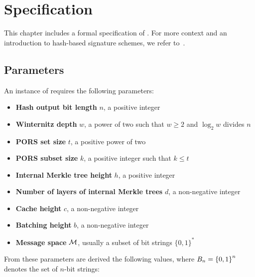 \chapter{Specification}\label{chap:specification}

This chapter includes a formal specification of \gravity. 
For more context and an introduction to hash-based signature schemes, we refer to~\cite{masters,ctrsapaper}.

\section{Parameters}

An instance of \gravity{} requires the following parameters:
\begin{itemize}
\item \textbf{Hash output bit length} $n$, a positive integer
\item \textbf{Winternitz depth} $w$, a power of two such that $w \ge 2$ and $\log_2{w}$ divides $n$
\item \textbf{PORS set size} $t$, a positive power of two
\item \textbf{PORS subset size} $k$, a positive integer such that $k \le t$
\item \textbf{Internal Merkle tree height} $h$, a positive integer
\item \textbf{Number of layers of internal Merkle trees} $d$, a non-negative integer
\item \textbf{Cache height} $c$, a non-negative integer
\item \textbf{Batching height} $b$, a non-negative integer
\item \textbf{Message space} $\mathcal{M}$, usually a subset of bit strings ${\{0,1\}}^*$
\end{itemize}
%
From these parameters are derived the following values, where $B_n = {\{0,1\}}^n$ denotes the set of $n$-bit strings:
